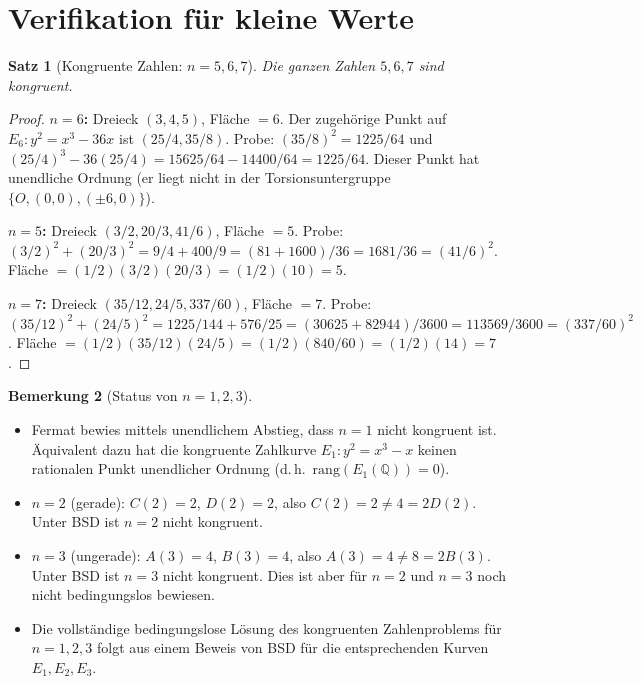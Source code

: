 \documentclass[12pt,a4paper]{amsart}
\newtheorem{theorem}{Satz}[section]
\theoremstyle{definition}
\newtheorem{remark}[theorem]{Bemerkung}
\newcommand{\Q}{\mathbb{Q}}
\begin{document}
\section{Verifikation f\"ur kleine Werte}

\begin{theorem}[Kongruente Zahlen: $n = 5, 6, 7$]
\label{thm:small_examples}
Die ganzen Zahlen $5, 6, 7$ sind kongruent.
\end{theorem}

\begin{proof}
\textbf{$n = 6$:} Dreieck $(3, 4, 5)$, Fl\"ache $= 6$.
Der zugeh\"orige Punkt auf $E_6: y^2 = x^3 - 36x$ ist $(25/4, 35/8)$.
Probe: $(35/8)^2 = 1225/64$ und $(25/4)^3 - 36(25/4)
= 15625/64 - 14400/64 = 1225/64$. \checkmark
Dieser Punkt hat unendliche Ordnung (er liegt nicht in der Torsionsuntergruppe
$\{O,(0,0),(\pm 6, 0)\}$).

\textbf{$n = 5$:} Dreieck $(3/2, 20/3, 41/6)$, Fl\"ache $= 5$.
Probe: $(3/2)^2 + (20/3)^2 = 9/4 + 400/9 = (81+1600)/36 = 1681/36 = (41/6)^2$. \checkmark
Fl\"ache $= (1/2)(3/2)(20/3) = (1/2)(10) = 5$. \checkmark

\textbf{$n = 7$:} Dreieck $(35/12, 24/5, 337/60)$, Fl\"ache $= 7$.
Probe: $(35/12)^2 + (24/5)^2 = 1225/144 + 576/25 = (30625 + 82944)/3600
= 113569/3600 = (337/60)^2$. \checkmark
Fl\"ache $= (1/2)(35/12)(24/5) = (1/2)(840/60) = (1/2)(14) = 7$. \checkmark
\end{proof}

\begin{remark}[Status von $n = 1, 2, 3$]
\begin{itemize}
  \item Fermat bewies mittels unendlichem Abstieg, dass $n=1$ nicht kongruent
    ist. \"Aquivalent dazu hat die kongruente Zahlkurve $E_1\colon y^2 = x^3 - x$
    keinen rationalen Punkt unendlicher Ordnung (d.\,h.\ $\mathrm{rang}(E_1(\Q)) = 0$).
  \item $n = 2$ (gerade): $C(2) = 2$, $D(2) = 2$, also $C(2) = 2 \ne 4 = 2D(2)$.
    Unter BSD ist $n=2$ nicht kongruent.
  \item $n = 3$ (ungerade): $A(3) = 4$, $B(3) = 4$, also $A(3) = 4 \ne 8 = 2B(3)$.
    Unter BSD ist $n=3$ nicht kongruent.
    Dies ist aber f\"ur $n=2$ und $n=3$ noch nicht bedingungslos bewiesen.
  \item Die vollst\"andige bedingungslose L\"osung des kongruenten
    Zahlenproblems f\"ur $n=1,2,3$ folgt aus einem Beweis von BSD
    f\"ur die entsprechenden Kurven $E_1, E_2, E_3$.
\end{itemize}
\end{remark}
\end{document}
